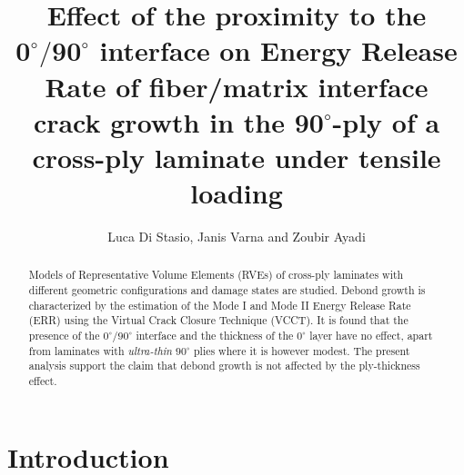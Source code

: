 \documentclass[Review,sagev,times]{sagej}
\begin{document}

\title{Effect of the proximity to the $\mathbf{0^{\circ}/90^{\circ}}$ interface on Energy Release Rate of fiber/matrix interface crack growth in the  $\mathbf{90^{\circ}}$-ply of a cross-ply laminate under tensile loading}

\author{Luca Di Stasio, Janis Varna and Zoubir Ayadi}




\begin{abstract}
Models of Representative Volume Elements (RVEs) of cross-ply laminates with different geometric configurations and damage states are studied. Debond growth is characterized by the estimation of the Mode I and Mode II Energy Release Rate (ERR) using the Virtual Crack Closure Technique (VCCT). It is found that the presence of the $0^{\circ}/90^{\circ}$ interface and the thickness of the $0^{\circ}$ layer have no effect, apart from laminates with \emph{ultra-thin} $90^{\circ}$ plies where it is however modest. The present analysis support the claim that debond growth is not affected by the ply-thickness effect.
\end{abstract}


\maketitle


\section{Introduction}
\end{document}
